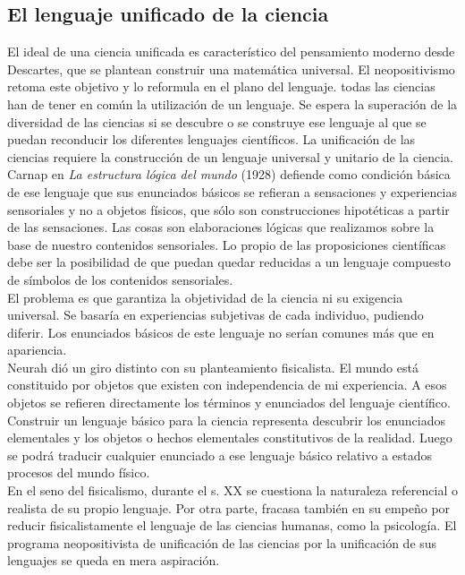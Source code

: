 \documentclass[a4paper, 11pt, twocolumn, spanish]{article}
\begin{document}
\subsection{El lenguaje unificado de la ciencia}
\label{sec:org1b4ee40}
El ideal de una ciencia unificada es característico del pensamiento
moderno desde Descartes, que se plantean construir una matemática
universal. El neopositivismo retoma este objetivo y lo reformula en el
plano del lenguaje. todas las ciencias han de tener en común la
utilización de un lenguaje. Se espera la superación de la diversidad
de las ciencias si se descubre o se construye ese lenguaje al que se
puedan reconducir los diferentes lenguajes científicos. La unificación
de las ciencias requiere la construcción de un lenguaje universal y
unitario de la ciencia.\\[0pt]

Carnap en \emph{La estructura lógica del mundo} (1928) defiende como
condición básica de ese lenguaje que sus enunciados básicos se
refieran a sensaciones y experiencias sensoriales y no a objetos
físicos, que sólo son construcciones hipotéticas a partir de las
sensaciones. Las cosas son elaboraciones lógicas que realizamos sobre
la base de nuestro contenidos sensoriales. Lo propio de las
proposiciones científicas debe ser la posibilidad de que puedan quedar
reducidas a un lenguaje compuesto de símbolos de los contenidos
sensoriales.\\[0pt]

El problema es que garantiza la objetividad de la ciencia ni su
exigencia universal. Se basaría en experiencias subjetivas de cada
individuo, pudiendo diferir. Los enunciados básicos de este lenguaje
no serían comunes más que en apariencia.\\[0pt]
Neurah dió un giro distinto con su planteamiento fisicalista. El mundo
está constituido por objetos que existen con independencia de mi
experiencia. A esos objetos se refieren directamente los términos y
enunciados del lenguaje científico. Construir un lenguaje básico para
la ciencia representa descubrir los enunciados elementales y los
objetos o hechos elementales constitutivos de la realidad. Luego se
podrá traducir cualquier enunciado a ese lenguaje básico relativo a
estados  procesos del mundo físico.\\[0pt]

En el seno del fisicalismo, durante el s. XX se cuestiona la
naturaleza referencial o realista de su propio lenguaje. Por otra
parte, fracasa también en su empeño por reducir fisicalistamente el
lenguaje de las ciencias humanas, como la psicología. El programa
neopositivista de unificación de las ciencias por la unificación de
sus lenguajes se queda en mera aspiración.
\end{document}
